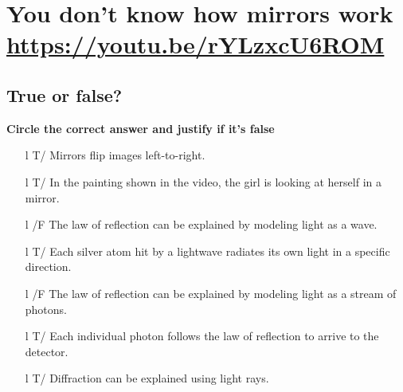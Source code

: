 \documentclass[a4paper, 11pt, final, garamond]{book}
\begin{document}
\setcounter{chapter}{1}


\chapter{You don't know how mirrors work \url{https://youtu.be/rYLzxcU6ROM}}

\section{True or false\!?}

\textbf{Circle the correct answer and justify if it's false}
\begin{enumerate}[label=\sqenumi, leftmargin=10pt]
  \item[l]{T/} %
	Mirrors flip images left-to-right.
	\smallbreak
	\smallbreak
	\dotfill
	\item[l]{T/} %
    In the painting shown in the video, the girl is looking at herself in a
    mirror.
	\smallbreak
	\smallbreak
	\dotfill
	\item[l]{/F} %
    The law of reflection can be explained by modeling light as a wave.
	\smallbreak
	\smallbreak
	\dotfill
	\item[l]{T/} %
    Each silver atom hit by a lightwave radiates its own light in a specific
    direction.
	\smallbreak
	\smallbreak
	\dotfill
	\item[l]{/F} %
    The law of reflection can be explained by modeling light as a stream of
    photons.
	\smallbreak
	\smallbreak
	\dotfill
	\item[l]{T/} %
    Each individual photon follows the law of reflection to arrive to the
    detector.
	\smallbreak
	\smallbreak
	\dotfill
	\item[l]{T/} %
    Diffraction can be explained using light rays.
	\smallbreak
	\smallbreak
	\dotfill
\end{enumerate}
\end{document}

